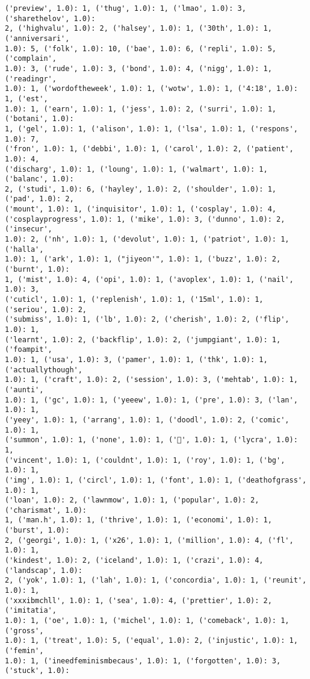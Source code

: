 \documentclass[11pt]{article}
\begin{document}
\begin{Verbatim}[commandchars=\\\{\}]
('preview', 1.0): 1, ('thug', 1.0): 1, ('lmao', 1.0): 3, ('sharethelov', 1.0):
2, ('highvalu', 1.0): 2, ('halsey', 1.0): 1, ('30th', 1.0): 1, ('anniversari',
1.0): 5, ('folk', 1.0): 10, ('bae', 1.0): 6, ('repli', 1.0): 5, ('complain',
1.0): 3, ('rude', 1.0): 3, ('bond', 1.0): 4, ('nigg', 1.0): 1, ('readingr',
1.0): 1, ('wordoftheweek', 1.0): 1, ('wotw', 1.0): 1, ('4:18', 1.0): 1, ('est',
1.0): 1, ('earn', 1.0): 1, ('jess', 1.0): 2, ('surri', 1.0): 1, ('botani', 1.0):
1, ('gel', 1.0): 1, ('alison', 1.0): 1, ('lsa', 1.0): 1, ('respons', 1.0): 7,
('fron', 1.0): 1, ('debbi', 1.0): 1, ('carol', 1.0): 2, ('patient', 1.0): 4,
('discharg', 1.0): 1, ('loung', 1.0): 1, ('walmart', 1.0): 1, ('balanc', 1.0):
2, ('studi', 1.0): 6, ('hayley', 1.0): 2, ('shoulder', 1.0): 1, ('pad', 1.0): 2,
('mount', 1.0): 1, ('inquisitor', 1.0): 1, ('cosplay', 1.0): 4,
('cosplayprogress', 1.0): 1, ('mike', 1.0): 3, ('dunno', 1.0): 2, ('insecur',
1.0): 2, ('nh', 1.0): 1, ('devolut', 1.0): 1, ('patriot', 1.0): 1, ('halla',
1.0): 1, ('ark', 1.0): 1, ("jiyeon'", 1.0): 1, ('buzz', 1.0): 2, ('burnt', 1.0):
1, ('mist', 1.0): 4, ('opi', 1.0): 1, ('avoplex', 1.0): 1, ('nail', 1.0): 3,
('cuticl', 1.0): 1, ('replenish', 1.0): 1, ('15ml', 1.0): 1, ('seriou', 1.0): 2,
('submiss', 1.0): 1, ('lb', 1.0): 2, ('cherish', 1.0): 2, ('flip', 1.0): 1,
('learnt', 1.0): 2, ('backflip', 1.0): 2, ('jumpgiant', 1.0): 1, ('foampit',
1.0): 1, ('usa', 1.0): 3, ('pamer', 1.0): 1, ('thk', 1.0): 1, ('actuallythough',
1.0): 1, ('craft', 1.0): 2, ('session', 1.0): 3, ('mehtab', 1.0): 1, ('aunti',
1.0): 1, ('gc', 1.0): 1, ('yeeew', 1.0): 1, ('pre', 1.0): 3, ('lan', 1.0): 1,
('yeey', 1.0): 1, ('arrang', 1.0): 1, ('doodl', 1.0): 2, ('comic', 1.0): 1,
('summon', 1.0): 1, ('none', 1.0): 1, ('🙅', 1.0): 1, ('lycra', 1.0): 1,
('vincent', 1.0): 1, ('couldnt', 1.0): 1, ('roy', 1.0): 1, ('bg', 1.0): 1,
('img', 1.0): 1, ('circl', 1.0): 1, ('font', 1.0): 1, ('deathofgrass', 1.0): 1,
('loan', 1.0): 2, ('lawnmow', 1.0): 1, ('popular', 1.0): 2, ('charismat', 1.0):
1, ('man.h', 1.0): 1, ('thrive', 1.0): 1, ('economi', 1.0): 1, ('burst', 1.0):
2, ('georgi', 1.0): 1, ('x26', 1.0): 1, ('million', 1.0): 4, ('fl', 1.0): 1,
('kindest', 1.0): 2, ('iceland', 1.0): 1, ('crazi', 1.0): 4, ('landscap', 1.0):
2, ('yok', 1.0): 1, ('lah', 1.0): 1, ('concordia', 1.0): 1, ('reunit', 1.0): 1,
('xxxibmchll', 1.0): 1, ('sea', 1.0): 4, ('prettier', 1.0): 2, ('imitatia',
1.0): 1, ('oe', 1.0): 1, ('michel', 1.0): 1, ('comeback', 1.0): 1, ('gross',
1.0): 1, ('treat', 1.0): 5, ('equal', 1.0): 2, ('injustic', 1.0): 1, ('femin',
1.0): 1, ('ineedfeminismbecaus', 1.0): 1, ('forgotten', 1.0): 3, ('stuck', 1.0):

\end{Verbatim}
\end{document}
